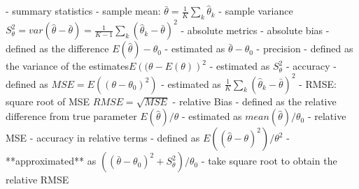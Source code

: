 \documentclass[a4paper,10pt]{article}
\title{}
\author{}
\begin{document}
\maketitle

\begin{abstract}

\end{abstract}

\section{}

- summary statistics
  - sample mean: $\bar{\theta} =  \frac{1}{K} \sum_k \hat{\theta}_k$
  - sample variance $S^2_{\theta} = var(\hat{\theta}-\bar{\theta}) = \frac{1}{K-1} \sum_k (\hat{\theta}_k-\bar{\theta})^2 $ 
- absolute metrics
  - absolute bias
    - defined as the difference $E(\hat{\theta})-\theta_0$
    - estimated as $\bar{\theta} -\theta_0$
  - precision
    - defined as the variance of the estimates$E \left( (\theta-E(\theta) \right)^2$
    - estimated as $S^2_{\theta}$
  - accuracy
    - defined as $MSE=E((\theta-\theta_0)^2 )$
    - estimated as $ \frac{1}{K} \sum_k (\hat{\theta}_k-\bar{\theta})^2 $ 
    - RMSE: square root of MSE $RMSE = \sqrt{MSE}$
- relative Bias
  - defined as the relative difference from true parameter  $E(\hat{\theta})/\theta$
  - estimated as $mean(\hat{\theta})/\theta_0$
- relative MSE
  - accuracy in relative terms
  - defined as $E((\hat{\theta}- \theta)^2)/\theta^2$
  - **approximated** as $\left( (\bar{\theta} -\theta_0)^2 + S^2_{\theta} \right)/\theta_0$ 
  - take square root to obtain the relative RMSE 
\end{document}
